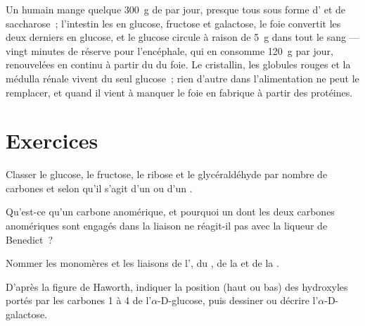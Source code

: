 \begin{example}\label{ex:b1:carbohydrates:day}
Un humain mange quelque \qty{300}{g} de  par jour, presque tous
sous forme d' et de saccharose~; l'intestin les  en
glucose, fructose et galactose, le foie convertit les deux derniers en
glucose, et le glucose circule à raison de \qty{5}{g} dans tout le sang
--- vingt minutes de réserve pour l'encéphale, qui en consomme
\qty{120}{g} par jour, renouvelées en continu à partir du  du
foie. Le cristallin, les globules rouges et la médulla rénale vivent du
seul glucose~; rien d'autre dans l'alimentation ne peut le remplacer, et
quand il vient à manquer le foie en fabrique à partir des protéines.
\end{example}

\section{Exercices}

\begin{exercise}[$\star$]\label{exo:b1:carbohydrates:1}
Classer le glucose, le fructose, le ribose et le glycéraldéhyde par
nombre de carbones et selon qu'il s'agit d'un  ou d'un .
\end{exercise}

\begin{exercise}[$\star$]\label{exo:b1:carbohydrates:2}
Qu'est-ce qu'un carbone anomérique, et pourquoi un  dont les
deux carbones anomériques sont engagés dans la liaison ne réagit-il pas
avec la liqueur de Benedict~?
\end{exercise}

\begin{exercise}[$\star$]\label{exo:b1:carbohydrates:3}
Nommer les monomères et les liaisons de l', du , de la
 et de la .
\end{exercise}

\begin{exercise}[$\star$]\label{exo:b1:carbohydrates:4}
D'après la figure de Haworth, indiquer la position (haut ou bas) des
hydroxyles portés par les carbones 1 à 4 de l'$\alpha$-D-glucose, puis
dessiner ou décrire l'$\alpha$-D-galactose.
\end{exercise}

